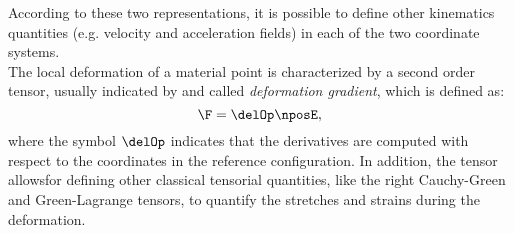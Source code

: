 According to these two representations, it is possible to define other kinematics quantities (e.g. velocity and acceleration fields) in each of the two coordinate systems.\\
The local deformation of a material point is characterized by a second order tensor, usually indicated by \F and called \textit{deformation gradient}, which is defined as:
\begin{equation}
  \F = \delOp\nposE,
  \label{eq:tensorF}
\end{equation}
where the symbol $\delOp$ indicates that the derivatives are computed with respect to the coordinates in the reference configuration. In addition, the tensor \F allowsfor defining other classical tensorial quantities, like the right Cauchy-Green and Green-Lagrange tensors, to quantify the stretches and strains during the deformation.\\

